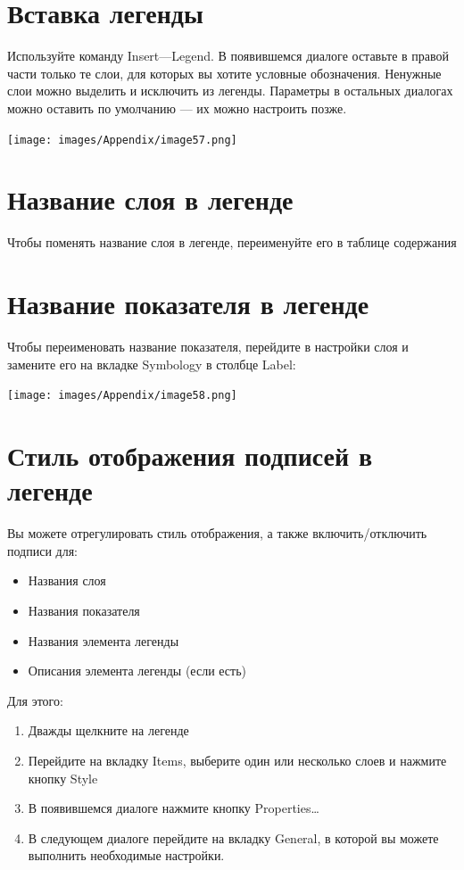 \documentclass[12pt,]{book}
\begin{document}
\hypertarget{section-55}{%
\section{Вставка легенды}\label{section-55}}

Используйте команду Insert---Legend. В появившемся диалоге оставьте в правой части только те слои, для которых вы хотите условные обозначения. Ненужные слои можно выделить и исключить из легенды. Параметры в остальных диалогах можно оставить по умолчанию --- их можно настроить позже.

\texttt{[image: images/Appendix/image57.png]}

\hypertarget{section-56}{%
\section{Название слоя в легенде}\label{section-56}}

Чтобы поменять название слоя в легенде, переименуйте его в таблице содержания

\hypertarget{section-57}{%
\section{Название показателя в легенде}\label{section-57}}

Чтобы переименовать название показателя, перейдите в настройки слоя и замените его на вкладке Symbology в столбце Label:

\texttt{[image: images/Appendix/image58.png]}

\hypertarget{section-58}{%
\section{Стиль отображения подписей в легенде}\label{section-58}}

Вы можете отрегулировать стиль отображения, а также включить/отключить подписи для:

\begin{itemize}
\item
  Названия слоя
\item
  Названия показателя
\item
  Названия элемента легенды
\item
  Описания элемента легенды (если есть)
\end{itemize}

Для этого:

\begin{enumerate}
\def\labelenumi{\arabic{enumi}.}
\item
  Дважды щелкните на легенде
\item
  Перейдите на вкладку Items, выберите один или несколько слоев и нажмите кнопку Style
\item
  В появившемся диалоге нажмите кнопку Properties\ldots{}
\item
  В следующем диалоге перейдите на вкладку General, в которой вы можете выполнить необходимые настройки.
\end{enumerate}
\end{document}
